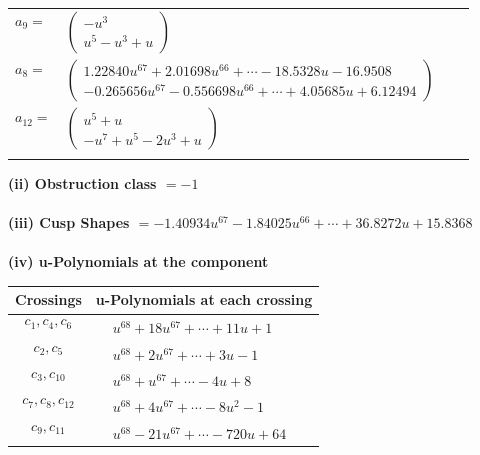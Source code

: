 \documentclass[1p]{elsarticle_modified}
\theoremstyle{definition}
\begin{document}
\begin{tabular}{m{7pt} m{180pt} m{7pt} m{180pt} }
\flushright $a_{9}=$&$\begin{pmatrix}- u^3\\u^5- u^3+u\end{pmatrix}$ \\
\flushright $a_{8}=$&$\begin{pmatrix}1.22840 u^{67}+2.01698 u^{66}+\cdots-18.5328 u-16.9508\\-0.265656 u^{67}-0.556698 u^{66}+\cdots+4.05685 u+6.12494\end{pmatrix}$ \\
\flushright $a_{12}=$&$\begin{pmatrix}u^5+u\\- u^7+u^5-2 u^3+u\end{pmatrix}$\\&\end{tabular}
\flushleft \textbf{(ii) Obstruction class $= -1$}\\~\\
\flushleft \textbf{(iii) Cusp Shapes $= -1.40934 u^{67}-1.84025 u^{66}+\cdots+36.8272 u+15.8368$}\\~\\
\newpage\renewcommand{\arraystretch}{1}
\flushleft \textbf{(iv) u-Polynomials at the component}\newline \\
\begin{tabular}{m{50pt}|m{274pt}}
Crossings & \hspace{64pt}u-Polynomials at each crossing \\
\hline $$\begin{aligned}c_{1},c_{4},c_{6}\end{aligned}$$&$\begin{aligned}
&u^{68}+18 u^{67}+\cdots+11 u+1
\end{aligned}$\\
\hline $$\begin{aligned}c_{2},c_{5}\end{aligned}$$&$\begin{aligned}
&u^{68}+2 u^{67}+\cdots+3 u-1
\end{aligned}$\\
\hline $$\begin{aligned}c_{3},c_{10}\end{aligned}$$&$\begin{aligned}
&u^{68}+u^{67}+\cdots-4 u+8
\end{aligned}$\\
\hline $$\begin{aligned}c_{7},c_{8},c_{12}\end{aligned}$$&$\begin{aligned}
&u^{68}+4 u^{67}+\cdots-8 u^2-1
\end{aligned}$\\
\hline $$\begin{aligned}c_{9},c_{11}\end{aligned}$$&$\begin{aligned}
&u^{68}-21 u^{67}+\cdots-720 u+64
\end{aligned}$\\
\hline
\end{tabular}\\~\\
\end{document}
